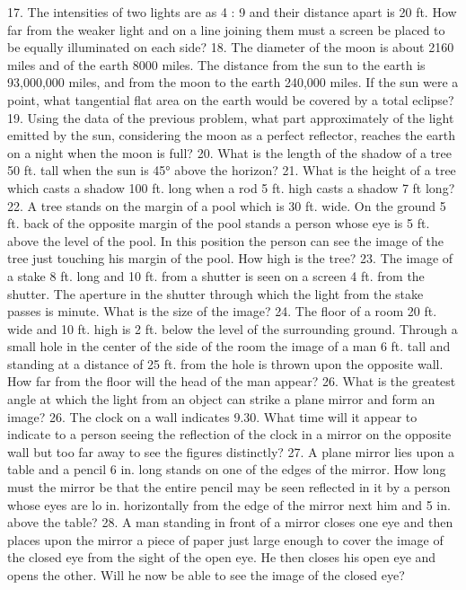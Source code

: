 17. The intensities of two lights are as 4 : 9 and their distance apart is 20 ft. How far from the weaker light and on a line joining them must a screen be placed to be equally illuminated on each side?
18. The diameter of the moon is about 2160 miles and of the earth 8000 miles. The distance from the sun to the earth is 93,000,000 miles, and from the moon to the earth 240,000 miles. If the sun were a point, what tangential flat area on the earth would be covered by a total eclipse?
19. Using the data of the previous problem, what part approximately of the light emitted by the sun, considering the moon as a perfect reflector, reaches the earth on a night when the moon is full?
20. What is the length of the shadow of a tree 50 ft. tall when the sun is 45° above the horizon?
21. What is the height of a tree which casts a shadow 100 ft. long when a rod 5 ft. high casts a shadow 7 ft long?
22. A tree stands on the margin of a pool which is 30 ft. wide. On the ground 5 ft. back of the opposite margin of the pool stands a person whose eye is 5 ft. above the level of the pool. In this position the person can see the image of the tree just touching his margin of the pool. How high is the tree?
23. The image of a stake 8 ft. long and 10 ft. from a shutter is seen on a screen 4 ft. from the shutter. The aperture in the shutter through which the light from the stake passes is minute. What is the size of the image?
24. The floor of a room 20 ft. wide and 10 ft. high is 2 ft. below the level of the surrounding ground. Through a small hole in the center of the side of the room the image of a man 6 ft. tall and standing at a distance of 25 ft. from the hole is thrown upon the opposite wall. How far from the floor will the head of the man appear?
26. What is the greatest angle at which the light from an object can strike a plane mirror and form an image?
26. The clock on a wall indicates 9.30. What time will it appear to indicate to a person seeing the reflection of the clock in a mirror on the opposite wall but too far away to see the figures distinctly?
27. A plane mirror lies upon a table and a pencil 6 in. long stands on one of the edges of the mirror. How long must the mirror be that the entire pencil may be seen reflected in it by a person whose eyes are lo in. horizontally from the edge of the mirror next him and 5 in. above the table?
28. A man standing in front of a mirror closes one eye and then places upon the mirror a piece of paper just large enough to cover the image of the closed eye from the sight of the open eye. He then closes his open eye and opens the other. Will he now be able to see the image of the closed eye?

